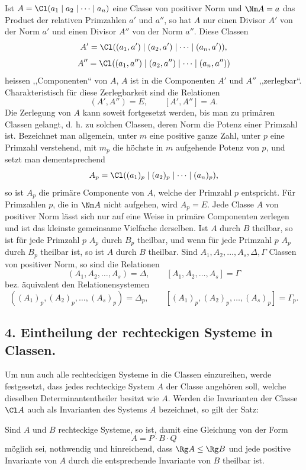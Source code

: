 Ist $A=\Cl(a_1\mid a_2\mid\cdots\mid a_n)$ eine Classe von positiver Norm und $\Nm A=a$ das Product der relativen Primzahlen $a'$ und $a''$, so hat $A$ nur einen Divisor $A'$ von der Norm $a'$ und einen Divisor $A''$ von der Norm $a''$. Diese Classen
\[
 A'=\Cl((a_1,a')\mid(a_2,a')\mid\cdots\mid(a_n,a')),
\]
\[
 A''=\Cl((a_1,a'')\mid(a_2,a'')\mid\cdots\mid(a_n,a''))
\]
heissen ,,Componenten`` von $A$, $A$ ist in die Componenten $A'$ und $A''$ ,,zerlegbar``. Charakteristisch für diese Zerlegbarkeit sind die Relationen
\[
 (A',A'')=E,
 \qquad [A',A'']=A.
\]
Die Zerlegung von $A$ kann soweit fortgesetzt werden, bis man zu primären Classen gelangt, d. h. zu solchen Classen, deren Norm die Potenz einer Primzahl ist. Bezeichnet man allgemein, unter $m$ eine positive ganze Zahl, unter $p$ eine Primzahl verstehend, mit $m_p$ die höchste in $m$ aufgehende Potenz von $p$, und setzt man dementsprechend
\[
 A_p=\Cl((a_1)_p\mid(a_2)_p\mid\cdots\mid(a_n)_p),
\]
so ist $A_p$ die primäre Componente von $A$, welche der Primzahl $p$ entspricht. Für Primzahlen $p$, die in $\Nm A$ nicht aufgehen, wird $A_p=E$. Jede Classe $A$ von positiver Norm lässt sich nur auf eine Weise in primäre Componenten zerlegen und ist das kleinste gemeinsame Vielfache derselben. Ist $A$ durch $B$ theilbar, so ist für jede Primzahl $p$ $A_p$ durch $B_p$ theilbar, und wenn für jede Primzahl $p$ $A_p$ durch $B_p$ theilbar ist, so ist $A$ durch $B$ theilbar. Sind $A_1,A_2,\ldots,A_s,\Delta,\Gamma$ Classen von positiver Norm, so sind die Relationen
\[
 (A_1,A_2,\ldots,A_s)=\Delta,\qquad [A_1,A_2,\ldots,A_s]=\Gamma
\]
bez. äquivalent den Relationensystemen
\[
 ((A_1)_p,(A_2)_p,\ldots,(A_s)_p)=\Delta_p,
 \qquad [(A_1)_p,(A_2)_p,\ldots,(A_s)_p]=\Gamma_p .
\]

\subsection*{4. Eintheilung der rechteckigen Systeme in Classen.}

Um nun auch alle rechteckigen Systeme in die Classen einzureihen, werde festgesetzt, dass jedes rechteckige System $A$ der Classe angehören soll, welche dieselben Determinantentheiler besitzt wie $A$. Werden die Invarianten der Classe $\Cl A$ auch als Invarianten des Systems $A$ bezeichnet, so gilt der Satz:

Sind $A$ und $B$ rechteckige Systeme, so ist, damit eine Gleichung von der Form
\[
 A=P\cdot B\cdot Q
\]
möglich sei, nothwendig und hinreichend, dass $\Rg A\le \Rg B$ und jede positive Invariante von $A$ durch die entsprechende Invariante von $B$ theilbar ist.


